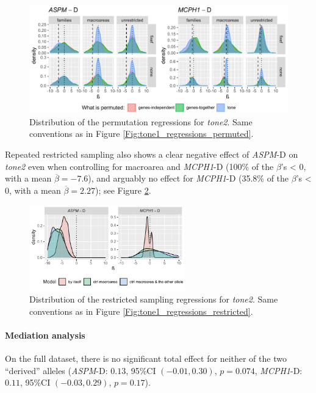\documentclass[twoside,onecolumn]{article}
\begin{document}
\begin{figure}[h]
  \centering
  \includegraphics[width=\textwidth]{../../code/figures/tone2_regressions_permuted}
  \caption{Distribution of the permutation regressions for \textit{tone2}. Same conventions as in Figure \ref{Fig:tone1_regressions_permuted}.}
  \label{Fig:tone2_regressions_permuted}
\end{figure}

Repeated restricted sampling also shows a clear negative effect of \textit{ASPM}-D on \textit{tone2} even when controlling for macroarea and \textit{MCPH1}-D (100\% of the $\beta$'s < 0, with a mean $\overline{\beta} = -7.6$), and arguably no effect for \textit{MCPH1}-D (35.8\% of the $\beta$'s < 0, with a mean $\overline{\beta} = 2.27$); see Figure \ref{Fig:tone2_regressions_restricted}.

\begin{figure}[h]
  \centering
  \includegraphics[width=0.6\textwidth]{../../code/figures/tone2_regressions_restricted}
  \caption{Distribution of the restricted sampling regressions for \textit{tone2}. Same conventions as in Figure \ref{Fig:tone1_regressions_restricted}.}
  \label{Fig:tone2_regressions_restricted}
\end{figure}


\paragraph{Mediation analysis}

On the full dataset, there is no significant total effect for neither of the two ``derived'' alleles (\textit{ASPM}-D: $0.13$, 95\%CI $(-0.01, 0.30)$, $p=0.074$, \textit{MCPH1}-D: $0.11$, 95\%CI $(-0.03, 0.29)$, $p=0.17$).
\end{document}
